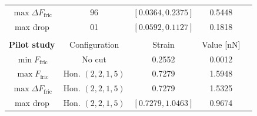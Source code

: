 \begin{table}[!htb]
\begin{center}
\begin{tabular}{| c | c | c | c | c |}
  $\max \Delta F_{\text{fric}}$  & 96 & $[0.0364, 0.2375]$ & 0.5448 & \multicolumn{1}{c}{} \\ \cline{1-4}
  max drop & 01 & $[0.0592, 0.1127]$ & 0.1818 & \multicolumn{1}{c}{} \\ \cline{1-4}
  \multicolumn{5}{c}{} \\ \cline{1-4}
  \textbf{Pilot study} & Configuration & Strain & Value [nN]  & \multicolumn{1}{c}{} \\ \cline{1-4}
  $\min F_{\text{fric}}$ & No cut & 0.2552 & 0.0012 & \multicolumn{1}{c}{} \\ \cline{1-4}
  $\max F_{\text{fric}}$ & Hon. $(2,2,1,5)$ & 0.7279 & 1.5948 & \multicolumn{1}{c}{} \\ \cline{1-4}
  $\max \Delta F_{\text{fric}}$  & Hon. $(2,2,1,5)$ & 0.7279 & 1.5325 & \multicolumn{1}{c}{} \\ \cline{1-4}
  max drop & Hon. $(2,2,1,5)$ & $[0.7279, 1.0463]$ & 0.9674 & \multicolumn{1}{c}{} \\ \cline{1-4}
\end{tabular}
\end{center}
\end{table}

